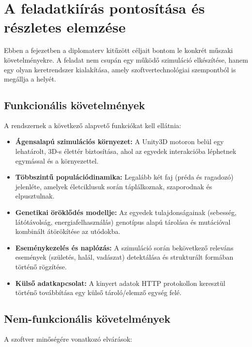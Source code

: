 \chapter{A feladatkiírás pontosítása és részletes elemzése}
\label{chap:elemzes}

Ebben a fejezetben a diplomaterv kitűzött céljait bontom le konkrét műszaki követelményekre. A feladat nem csupán egy működő szimuláció elkészítése, hanem egy olyan keretrendszer kialakítása, amely szoftvertechnológiai szempontból is megállja a helyét.

\section{Funkcionális követelmények}

A rendszernek a következő alapvető funkciókat kell ellátnia:

\begin{itemize}
    \item \textbf{Ágensalapú szimulációs környezet:} A Unity3D motoron belül egy lehatárolt, 3D-s élettér biztosítása, ahol az egyedek interakcióba léphetnek egymással és a környezettel.
    \item \textbf{Többszintű populációdinamika:} Legalább két faj (préda és ragadozó) jelenléte, amelyek életciklusuk során táplálkoznak, szaporodnak és elpusztulnak.
    \item \textbf{Genetikai öröklődés modellje:} Az egyedek tulajdonságainak (sebesség, látótávolság, energiafelhasználás) genotípus alapú tárolása és mutációval kombinált átörökítése az utódokba.
    \item \textbf{Eseménykezelés és naplózás:} A szimuláció során bekövetkező releváns események (születés, halál, vadászat) detektálása és strukturált formában történő rögzítése.
    \item \textbf{Külső adatkapcsolat:} A kinyert adatok HTTP protokollon keresztül történő továbbítása egy külső tároló/elemző egység felé.
\end{itemize}

\section{Nem-funkcionális követelmények}

A szoftver minőségére vonatkozó elvárások:

